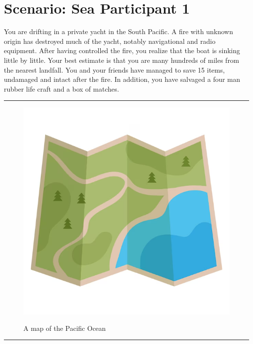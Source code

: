 \documentclass{article}
\begin{document}
    \section*{Scenario: \textmd{Sea} \hfill Participant \textmd{1}}
    \Large You are drifting in a private yacht in the South Pacific. A fire with unknown origin has destroyed much of the yacht, notably navigational and radio equipment. After having controlled the fire, you realize that the boat is sinking little by little. Your best estimate is that you are many hundreds of miles from the nearest landfall. You and your friends have managed to save 15 items, undamaged and intact after the fire. In addition, you have salvaged a four man rubber life craft and a box of matches.
\clearpage
        \par\noindent\rule{\textwidth}{0.4pt}
    \begin{figure}[H]
        \centering
        \begin{minipage}{0.25\textwidth}
            \centering
            \includegraphics[width=\textwidth]{../SurvivalItemImages/seamap}
        \end{minipage}\hfill
        \begin{minipage}{0.7\textwidth}
            \centering
            \Large A map of the Pacific Ocean
        \end{minipage}
    \end{figure}
    \vspace{-0.8em}
    \noindent\rule{\textwidth}{0.4pt}
            
\end{document}
